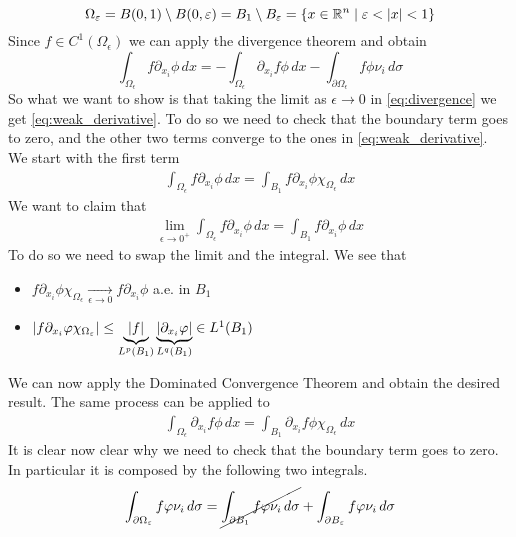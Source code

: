 \[
    \Omega_\epsilon = B(0, 1) \setminus B(0, \epsilon) = B_1 \setminus B_\epsilon = \left\{ x \in \real^n \mid \epsilon < \abs{x} < 1 \right\}
\]
Since \(f \in C^1(\Omega_\epsilon)\) we can apply the divergence theorem and obtain
\begin{equation}\label{eq:divergence}
\int_{\Omega_\epsilon} f \partial_{x_i} \phi \, dx = -\int_{\Omega_\epsilon} \partial_{x_i} f \phi \, dx - \int_{\partial\Omega_\epsilon} f \phi \nu_i \, d\sigma
\end{equation}
So what we want to show is that taking the limit as \(\epsilon \to 0\) in \eqref{eq:divergence} we get \eqref{eq:weak_derivative}. 
To do so we need to check that the boundary term goes to zero, and the other two terms converge to the ones in \eqref{eq:weak_derivative}. \\
We start with the first term
\[ 
    \begin{split}
        \int_{\Omega_\epsilon} f \partial_{x_i} \phi \, dx = \int_{B_1} f \partial_{x_i} \phi \chi_{\Omega_\epsilon} \, dx
    \end{split}
\]
We want to claim that 
\[
    \begin{split}
        \lim_{\epsilon \to 0^+} \int_{\Omega_\epsilon} f \partial_{x_i} \phi \, dx = \int_{B_1} f \partial_{x_i} \phi \, dx
    \end{split}
\]
To do so we need to swap the limit and the integral. We see that 
\begin{itemize}
    \item \(f \partial_{x_i} \phi \chi_{\Omega_\epsilon} \underset{\epsilon \to 0}{\longrightarrow} f \partial_{x_i} \phi\) a.e. in \(B_1\)
    \item \(\abs{f \partial_{x_i} \phi \chi_{\Omega_\epsilon}} \leq \underbrace{\abs{f}}_{L^p(B_1)} \underbrace{\abs{\partial_{x_i} \phi}}_{L^q(B_1)} \in L^1(B_1)\)
\end{itemize}
We can now apply the Dominated Convergence Theorem and obtain the desired result. 
The same process can be applied to
\[
    \begin{split}
        \int_{\Omega_\epsilon} \partial_{x_i} f \phi \, dx = \int_{B_1} \partial_{x_i} f \phi \chi_{\Omega_\epsilon} \, dx
    \end{split}
\]
It is clear now clear why we need to check that the boundary term goes to zero. In particular it is composed by the following two integrals.
\[
    \begin{split}
        \int_{\partial\Omega_\epsilon} f \phi \nu_i \, d\sigma = \cancel{\int_{\partial B_1} f \phi \nu_i \, d\sigma} + \int_{\partial B_\epsilon} f \phi \nu_i \, d\sigma
    \end{split}
\]
